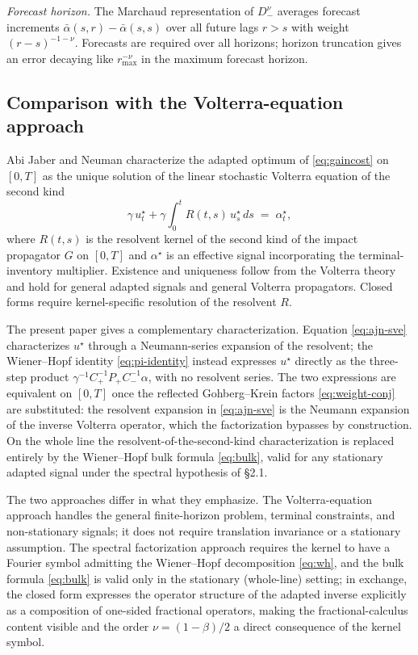 \documentclass[11pt]{article}
\theoremstyle{plain}
\begin{document}
\emph{Forecast horizon.} The Marchaud representation of $D_-^\nu$ averages forecast increments $\bar\alpha(s,r) - \bar\alpha(s,s)$ over all future lags $r > s$ with weight $(r-s)^{-1-\nu}$. Forecasts are required over all horizons; horizon truncation gives an error decaying like $r_{\max}^{-\nu}$ in the maximum forecast horizon.

\subsection{Comparison with the Volterra-equation approach}

Abi Jaber and Neuman \citeyearpar{AbiJaberNeuman2025} characterize the adapted optimum of \eqref{eq:gaincost} on $[0,T]$ as the unique solution of the linear stochastic Volterra equation of the second kind
\begin{equation}\label{eq:ajn-sve}
\gamma\,u^\star_t + \gamma\!\int_0^t R(t,s)\, u^\star_s\, ds \;=\; \alpha^\star_t,
\end{equation}
where $R(t,s)$ is the resolvent kernel of the second kind of the impact propagator $G$ on $[0,T]$ and $\alpha^\star$ is an effective signal incorporating the terminal-inventory multiplier. Existence and uniqueness follow from the Volterra theory and hold for general adapted signals and general Volterra propagators. Closed forms require kernel-specific resolution of the resolvent $R$.

The present paper gives a complementary characterization. Equation \eqref{eq:ajn-sve} characterizes $u^\star$ through a Neumann-series expansion of the resolvent; the Wiener--Hopf identity \eqref{eq:pi-identity} instead expresses $u^\star$ directly as the three-step product $\gamma^{-1}C_+^{-1}P_+C_-^{-1}\alpha$, with no resolvent series. The two expressions are equivalent on $[0,T]$ once the reflected Gohberg--Krein factors \eqref{eq:weight-conj} are substituted: the resolvent expansion in \eqref{eq:ajn-sve} is the Neumann expansion of the inverse Volterra operator, which the factorization bypasses by construction. On the whole line the resolvent-of-the-second-kind characterization is replaced entirely by the Wiener--Hopf bulk formula \eqref{eq:bulk}, valid for any stationary adapted signal under the spectral hypothesis of \S2.1.

The two approaches differ in what they emphasize. The Volterra-equation approach handles the general finite-horizon problem, terminal constraints, and non-stationary signals; it does not require translation invariance or a stationary assumption. The spectral factorization approach requires the kernel to have a Fourier symbol admitting the Wiener--Hopf decomposition \eqref{eq:wh}, and the bulk formula \eqref{eq:bulk} is valid only in the stationary (whole-line) setting; in exchange, the closed form expresses the operator structure of the adapted inverse explicitly as a composition of one-sided fractional operators, making the fractional-calculus content visible and the order $\nu = (1-\beta)/2$ a direct consequence of the kernel symbol.
\end{document}
